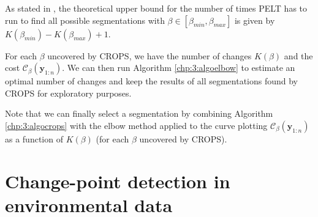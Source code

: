 
As stated in \cite{haynes2017}, the theoretical upper bound for the number of times PELT has to run to find all possible segmentations with $\beta\in[\beta_{min},\beta_{max}]$ is given by $K(\beta_{min})-K(\beta_{max})+1$. 

For each $\beta$ uncovered by CROPS, we have the number of changes $K(\beta)$ and the cost $\mathcal{C}_{\beta}(\bm y_{1:n})$. We can then run Algorithm \ref{chp:3:algoelbow} to estimate an optimal number of changes and keep the results of all segmentations found by CROPS for exploratory purposes. 

Note that we can finally select a segmentation by combining Algorithm \ref{chp:3:algocrops} with the elbow method applied to the curve plotting $\mathcal{C}_{\beta}(\bm y_{1:n})$ as a function of $K(\beta)$ (for each $\beta$ uncovered by CROPS).  

\section{Change-point detection in environmental data}\label{chp:3:5}


